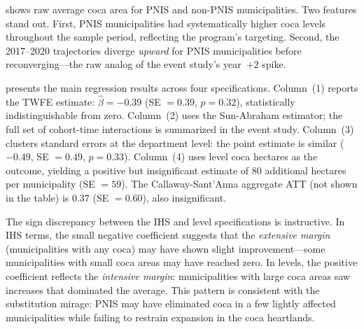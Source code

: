 \documentclass[12pt]{article}
\begin{document}
 shows raw average coca area for PNIS and non-PNIS municipalities. Two features stand out. First, PNIS municipalities had systematically higher coca levels throughout the sample period, reflecting the program's targeting. Second, the 2017--2020 trajectories diverge \emph{upward} for PNIS municipalities before reconverging---the raw analog of the event study's year~$+2$ spike.

 presents the main regression results across four specifications. Column~(1) reports the TWFE estimate: $\hat{\beta} = -0.39$ (SE $= 0.39$, $p = 0.32$), statistically indistinguishable from zero. Column~(2) uses the Sun-Abraham estimator; the full set of cohort-time interactions is summarized in the event study. Column~(3) clusters standard errors at the department level: the point estimate is similar ($-0.49$, SE $= 0.49$, $p = 0.33$). Column~(4) uses level coca hectares as the outcome, yielding a positive but insignificant estimate of 80 additional hectares per municipality (SE $= 59$). The Callaway-Sant'Anna aggregate ATT (not shown in the table) is $0.37$ (SE $= 0.60$), also insignificant.

The sign discrepancy between the IHS and level specifications is instructive. In IHS terms, the small negative coefficient suggests that the \emph{extensive margin} (municipalities with any coca) may have shown slight improvement---some municipalities with small coca areas may have reached zero. In levels, the positive coefficient reflects the \emph{intensive margin}: municipalities with large coca areas saw increases that dominated the average. This pattern is consistent with the substitution mirage: PNIS may have eliminated coca in a few lightly affected municipalities while failing to restrain expansion in the coca heartlands.
\end{document}
